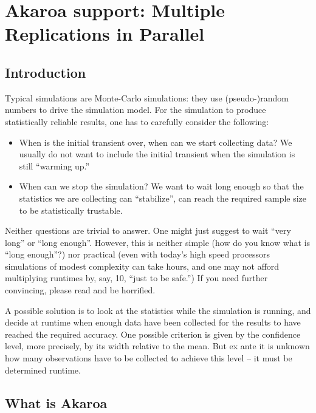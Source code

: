 \section{Akaroa support: Multiple Replications in Parallel}
\label{sec:ch-run-sim:akaroa}

\subsection{Introduction}

Typical simulations are Monte-Carlo simulations: they use
(pseudo-)random numbers to drive the simulation model.
For the simulation to produce statistically reliable results,
one has to carefully consider the following:

\begin{itemize}
  \item{When is the initial transient over, when can we start
    collecting data? We usually do not want to include the
    initial transient when the simulation is still ``warming up.''}
  \item{When can we stop the simulation? We want to wait long enough
    so that the statistics we are collecting can ``stabilize'',
    can reach the required sample size to be statistically trustable.}
\end{itemize}

Neither questions are trivial to answer. One might just suggest
to wait ``very long'' or ``long enough''. However, this is neither
simple (how do you know what is ``long enough''?) nor practical
(even with today's high speed processors simulations of modest complexity
can take hours, and one may not afford multiplying runtimes by,
say, 10, ``just to be safe.'') If you need further convincing,
please read \cite{Pawlikowsky02} and be horrified.

A possible solution is to look at the statistics while the simulation
is running, and decide at runtime when enough data have been
collected for the results to have reached the required accuracy.
One possible criterion is given by the confidence level,
more precisely, by its width relative to the mean.
But ex ante it is unknown how many observations have to be collected
to achieve this level -- it must be determined runtime.


\subsection{What is Akaroa}

